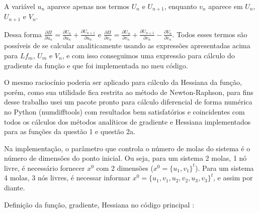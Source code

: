 \documentclass[10pt, a4paper]{article}
\begin{document}
A variável $u_n$ aparece apenas nos termos $U_n$ e $U_{n+1}$, enquanto $v_n$ aparece em $U_n$, $U_{n+1}$ e $V_n$.

Dessa forma $\frac{\partial \Pi}{\partial u_n} = \frac{\partial U_n}{\partial u_n} + \frac{\partial U_{n+1}}{\partial u_n}$ e 
$\frac{\partial \Pi}{\partial v_n} = \frac{\partial U_n}{\partial v_n} + \frac{\partial U_{n+1}}{\partial v_n} -
\frac{\partial V_n}{\partial v_n} $. Todos esses termos são possíveis de se calcular analiticamente usando as expressões
apresentadas acima para $Lf_m$, $U_m$ e $V_n$, e com isso conseguimos uma expressão para cálculo do gradiente da função e que
foi implementada no meu código.

O mesmo raciocínio poderia ser aplicado para cálculo da Hessiana da função, porém, como sua utilidade fica restrita ao
método de Newton-Raphson, para fins desse trabalho usei um pacote pronto para cálculo diferencial de forma numérica no Python 
(numdifftools) com resultados bem satisfatórios e coincidentes com todos os cálculos dos métodos
analíticos de gradiente e Hessiana implementados para as funções da questão 1 e questão 2a.

Na implementação, o parâmetro que controla o número de molas do sistema é o número de dimensões do ponto inicial. Ou seja,
para um sistema 2 molas, 1 nó livre, é necessário fornecer $x^0$ com 2 dimensões ($x^0 = \{u_1, v_1\}^t$). Para um
sistema 4 molas, 3 nós livres, é necessar informar $x^0 = \{u_1, v_1, u_2, v_2, u_3, v_3\}^t$, e assim por diante.

\vspace{5mm}
Definição da função, gradiente, Hessiana no código principal :
\end{document}
